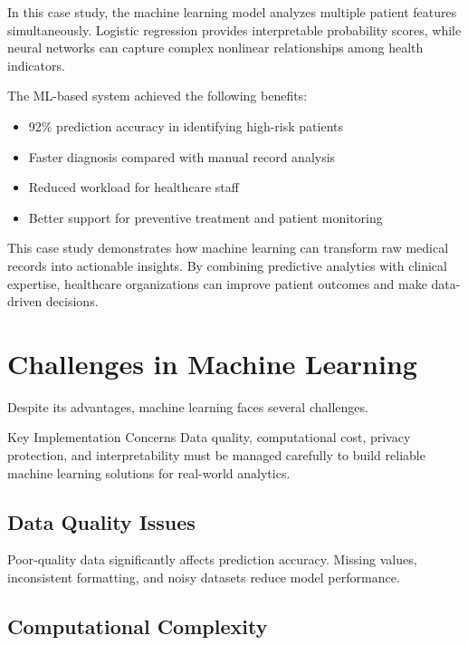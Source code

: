 \documentclass[11pt,a4paper]{article}
\begin{document}
In this case study, the machine learning model analyzes multiple patient features simultaneously. Logistic regression provides interpretable probability scores, while neural networks can capture complex nonlinear relationships among health indicators.

The ML-based system achieved the following benefits:
\begin{itemize}
    \item 92\% prediction accuracy in identifying high-risk patients
    \item Faster diagnosis compared with manual record analysis
    \item Reduced workload for healthcare staff
    \item Better support for preventive treatment and patient monitoring
\end{itemize}

This case study demonstrates how machine learning can transform raw medical records into actionable insights. By combining predictive analytics with clinical expertise, healthcare organizations can improve patient outcomes and make data-driven decisions.


\section{Challenges in Machine Learning}

Despite its advantages, machine learning faces several challenges.

\begin{summarybox}{Key Implementation Concerns}
Data quality, computational cost, privacy protection, and interpretability must be managed carefully to build reliable machine learning solutions for real-world analytics.
\end{summarybox}

\subsection{Data Quality Issues}

Poor-quality data significantly affects prediction accuracy. Missing values, inconsistent formatting, and noisy datasets reduce model performance.

\subsection{Computational Complexity}
\end{document}
